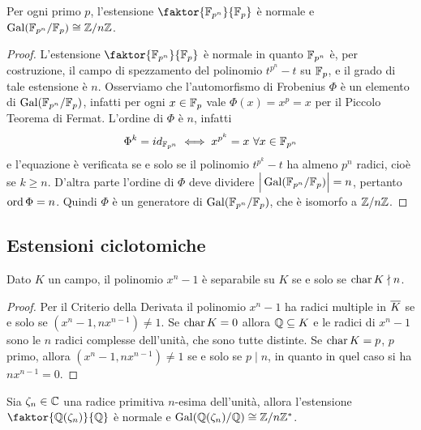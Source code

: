\documentclass[11pt]{scrartcl}
\begin{document}
\begin{theorem}
    Per ogni primo $p$, l'estensione $\faktor{\FF_{p^n}}{\FF_p}$ è normale e 
    $\operatorname{Gal}(\mathbb F_{p^n}/\mathbb F_p) \cong {\mathbb Z}/n{\mathbb Z}$.
\end{theorem}

\begin{proof}
    L'estensione $\faktor{\FF_{p^n}}{\FF_p}$ è normale in quanto $\mathbb F_{p^n}$
    è, per costruzione, il campo di spezzamento del polinomio $t^{p^n} - t$
    su $\mathbb F_p$, e il grado di tale estensione è $n$. Osserviamo che l'automorfismo
    di Frobenius $\Phi$ è un elemento di $\operatorname{Gal}(\mathbb F_{p^n}/\mathbb F_p)$, infatti 
    per ogni $x \in \mathbb F_p$ vale $\Phi(x) = x^p = x$ per il Piccolo Teorema di Fermat.
    L'ordine di $\Phi$ è $n$, infatti 
    \[
        \Phi^k = id_{\mathbb F_{p^n}} \iff x^{p^k} = x~\forall x \in \mathbb F_{p^n}
    \]
    e l'equazione è verificata se e solo se il polinomio $t^{p^k} - t$ ha almeno
    $p^n$ radici, cioè se $k \geq n$. D'altra parte l'ordine di $\Phi$ deve 
    dividere $\Big|\operatorname{Gal}(\mathbb F_{p^n}/\mathbb F_p)\Big| = n$, pertanto $\operatorname{ord}\Phi = n$. Quindi $\Phi$ è un generatore 
    di $\operatorname{Gal}(\mathbb F_{p^n}/\mathbb F_p)$, che è isomorfo a ${\mathbb Z}/n{\mathbb Z}$.
\end{proof}

\subsection{Estensioni ciclotomiche}

\begin{lemma}
    \label{lemma3.8}
    Dato $K$ un campo, il polinomio $x^n - 1$ è separabile su $K$ se e solo 
    se $\text{char}\,{K} \nmid n$.
\end{lemma}

\begin{proof}
    Per il Criterio della Derivata il polinomio $x^n - 1$ ha radici multiple
    in $\overline{K}$ se e solo se $(x^n - 1, nx^{n - 1}) \neq 1$. Se $\text{char}\, K = 0$
    allora $\mathbb Q\subseteq K$ e le radici di 
    $x^n - 1$ sono le $n$ radici complesse dell'unità, che sono tutte distinte.
    Se $\text{char}\, K = p$, $p$ primo, allora $(x^n - 1, nx^{n - 1}) \neq 1$ se e solo
    se $p \mid n$, in quanto in quel caso si ha $nx^{n - 1} = 0$.
\end{proof}

\begin{theorem}
    \label{teorema3.9}
    Sia $\zeta_n\in \mathbb C$ una radice primitiva $n$-esima dell'unità, allora
    l'estensione $\faktor{\QQ(\zeta_n)}{\QQ}$ è normale e 
    $\operatorname{Gal}(\mathbb Q(\zeta_n)/\mathbb Q)\cong {\mathbb Z}/n{\mathbb Z}^*$.
\end{theorem}
\end{document}
